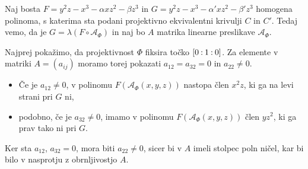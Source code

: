 \documentclass[mat1]{fmfdelo}
\numberwithin{equation}{section}
\newcommand{\linphi}{\mathcal{A}_\Phi}
\newcommand{\oio}{\pcoor{0: 1 : 0}}
\newcommand{\pcoor}[1]{%
\begingroup\lccode`~=`: \lowercase{\endgroup
\edef~}{\mathbin{\mathchar\the\mathcode`:}\nobreak}%
\left[%
\begingroup
\mathcode`:=\string"8000
#1%
\endgroup
\right]%
}
\theoremstyle{definition}
\begin{document}
\begin{dokaz}
    Naj bosta $F = y^2z - x^3 - \alpha xz^2 - \beta z^3$ in $G = y^2z - x^3 - \alpha' xz^2 - \beta' z^3$ homogena polinoma, s katerima sta podani projektivno ekvivalentni krivulji $C$ in $C'$. Tedaj vemo, da je $G = \lambda(F \circ \linphi)$ in naj bo $A$ matrika linearne preslikave $\linphi$.
    
    Najprej pokažimo, da projektivnost $\Phi$ fiksira točko $\oio$. Za elemente v matriki $A = (a_{ij})$ moramo torej pokazati $a_{12} = a_{32} = 0$ in $a_{22} \neq 0$. 
    \begin{itemize}
        \item Če je $a_{12} \neq 0$, v polinomu $F(\linphi(x,y,z))$ nastopa člen $x^2z$, ki ga na levi strani pri $G$ ni, 
        \item podobno, če je $a_{32} \neq 0$, imamo v polinomu $F(\linphi(x,y,z))$ člen $yz^2$, ki ga prav tako ni pri $G$. 
    \end{itemize}
    Ker sta $a_{12}$, $a_{32} = 0$, mora biti $a_{22} \neq 0$, sicer bi v $A$ imeli stolpec poln ničel, kar bi bilo v nasprotju z obrnljivostjo $A$. 
    

\end{dokaz}
\end{document}
